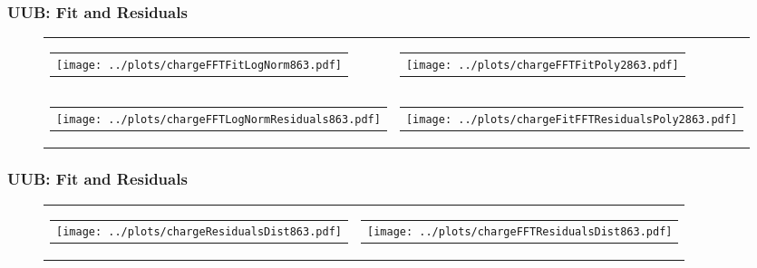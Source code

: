 \documentclass[aspectratio=169]{beamer}
\begin{document}
\begin{frame}
  \frametitle{UUB: Fit and Residuals}
  \begin{figure}
    \centering
    \begin{tabularx}{\textwidth}{CC}
      \begin{tabular}{l}
        \texttt{[image: ../plots/chargeFFTFitLogNorm863.pdf]}
      \end{tabular}
      &
      \begin{tabular}{l}
        \texttt{[image: ../plots/chargeFFTFitPoly2863.pdf]}
      \end{tabular}
      \\
      \begin{tabular}{l}
        \texttt{[image: ../plots/chargeFFTLogNormResiduals863.pdf]}
      \end{tabular}
      &
      \begin{tabular}{l}
        \texttt{[image: ../plots/chargeFitFFTResidualsPoly2863.pdf]}
      \end{tabular}
    \end{tabularx}
  \end{figure}
\end{frame}


\begin{frame}
  \frametitle{UUB: Fit and Residuals}
  \begin{figure}
    \centering
    \begin{tabularx}{\textwidth}{CC}
      \begin{tabular}{l}
        \texttt{[image: ../plots/chargeResidualsDist863.pdf]}
      \end{tabular}
      &
      \begin{tabular}{l}
        \texttt{[image: ../plots/chargeFFTResidualsDist863.pdf]}
      \end{tabular}
    \end{tabularx}
  \end{figure}
\end{frame}
\end{document}
